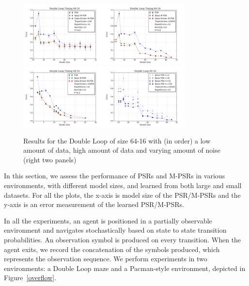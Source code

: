 \documentclass[letterpaper]{article}
\begin{document}
\begin{figure}[ht!]
\centering
\includegraphics[width=44mm]{64-16-100.png}\includegraphics[width=44mm]{64-16-10000.png}\includegraphics[width=44mm]{NoiseInfo.png}\includegraphics[width=44mm]{basePows.png}%
\vspace*{-4mm}
\caption{Results for the Double Loop of size 64-16 with (in order) a low amount of data, high amount of data and varying amount of noise (right two panels)\label{fig-double}\vspace*{-4mm}}
\end{figure}

In this section, we assess the performance of PSRs and M-PSRs in various environments, with different model sizes, and learned from both large and small datasets. For all the plots, the x-axis is model size of the PSR/M-PSRs and the y-axis is an error measurement of the learned PSR/M-PSRs.

In all the experiments, an agent is positioned in  a partially observable environment and navigates stochastically based on state to state transition probabilities. An observation symbol is produced on every transition. When the agent exits, we record the concatenation of the symbols produced, which represents the observation sequence.  We perform experiments in two environments: a Double Loop maze and a Pacman-style environment, depicted in Figure~\ref{overflow}.
\end{document}
